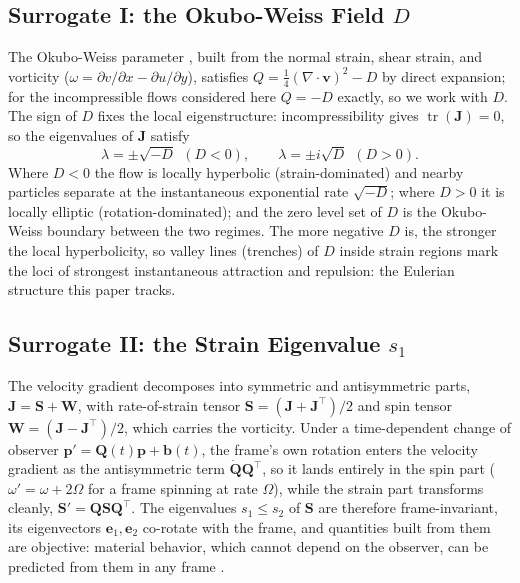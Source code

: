 \documentclass[lettersize,journal]{IEEEtran}
\begin{document}
\subsection{Surrogate I: the Okubo-Weiss Field $D$}

The Okubo-Weiss parameter \cite{21,22}, built from the normal strain,
shear strain, and vorticity
($\omega = \partial v/\partial x - \partial u/\partial y$), satisfies
$Q = \tfrac{1}{4}(\nabla \cdot \mathbf{v})^2 - D$ by direct expansion;
for the incompressible flows considered here $Q = -D$ exactly, so we
work with $D$. The sign of $D$ fixes the local eigenstructure:
incompressibility gives $\operatorname{tr}(\mathbf{J}) = 0$, so the
eigenvalues of $\mathbf{J}$ satisfy
\begin{equation}
    \lambda = \pm\sqrt{-D} \ \ (D < 0), \qquad
    \lambda = \pm i\sqrt{D} \ \ (D > 0).
    \label{eq:eig_detj}
\end{equation}
Where $D < 0$ the flow is locally hyperbolic (strain-dominated) and
nearby particles separate at the instantaneous exponential rate
$\sqrt{-D}$; where $D > 0$ it is locally elliptic (rotation-dominated);
and the zero level set of $D$ is the Okubo-Weiss boundary between the
two regimes. The more negative $D$ is, the stronger the local
hyperbolicity, so valley lines (trenches) of $D$ inside strain regions
mark the loci of strongest instantaneous attraction and repulsion: the
Eulerian structure this paper tracks.

\subsection{Surrogate II: the Strain Eigenvalue $s_1$}
\label{sec:strain_field}

The velocity gradient decomposes into symmetric and antisymmetric
parts, $\mathbf{J} = \mathbf{S} + \mathbf{W}$, with rate-of-strain
tensor $\mathbf{S} = (\mathbf{J} + \mathbf{J}^\top)/2$ and spin tensor
$\mathbf{W} = (\mathbf{J} - \mathbf{J}^\top)/2$, which carries the
vorticity. Under a time-dependent change of observer $\mathbf{p}' =
\mathbf{Q}(t)\mathbf{p} + \mathbf{b}(t)$, the frame's own rotation
enters the velocity gradient as the antisymmetric term
$\dot{\mathbf{Q}}\mathbf{Q}^\top$, so it lands entirely in the spin
part ($\omega' = \omega + 2\Omega$ for a frame spinning at rate
$\Omega$), while the strain part transforms cleanly, $\mathbf{S}' =
\mathbf{Q}\mathbf{S}\mathbf{Q}^\top$. The eigenvalues $s_1 \leq s_2$ of
$\mathbf{S}$ are therefore frame-invariant, its eigenvectors
$\mathbf{e}_1, \mathbf{e}_2$ co-rotate with the frame, and quantities
built from them are objective: material behavior, which cannot depend
on the observer, can be predicted from them in any frame \cite{16,17}.
\end{document}
